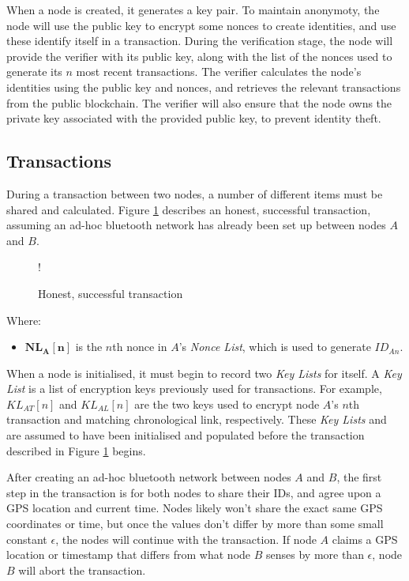 \documentclass[12pt]{article}
\begin{document}

When a node is created, it generates a key pair. To maintain anonymoty, the node will use the public key to encrypt some nonces to create identities, and use these identify itself in a transaction. During the verification stage, the node will provide the verifier with its public key, along with the list of the nonces used to generate its $n$ most recent transactions. The verifier calculates the node's identities using the public key and nonces, and retrieves the relevant transactions from the public blockchain. The verifier will also ensure that the node owns the private key associated with the provided public key, to prevent identity theft.

\subsection{Transactions} \label{sec:transactions}
During a transaction between two nodes, a number of different items must be shared and calculated. Figure \ref{fig:transaction} describes an honest, successful transaction, assuming an ad-hoc bluetooth network has already been set up between nodes $A$ and $B$.

\begin{figure}[h]
\resizebox {\columnwidth} {!} {}
\caption{Honest, successful transaction}
\label{fig:transaction}
\end{figure}

Where:
\begin{itemize}[noitemsep,topsep=0pt]
	\item[] $\mathbf{NL_A[n]}$ is the $n$th nonce in $A$'s \textit{Nonce List}, which is used to generate $ID_{An}$.
\end{itemize}

\null
When a node is initialised, it must begin to record two \textit{Key Lists} for itself. A \textit{Key List} is a list of encryption keys previously used for transactions. For example, $KL_{AT}[n]$ and $KL_{AL}[n]$ are the two keys used to encrypt node $A$'s $n$th transaction and matching chronological link, respectively. These \textit{Key Lists} and are assumed to have been initialised and populated before the transaction described in Figure \ref{fig:transaction} begins.

After creating an ad-hoc bluetooth network between nodes $A$ and $B$, the first step in the transaction is for both nodes to share their IDs, and agree upon a GPS location and current time. Nodes likely won't share the exact same GPS coordinates or time, but once the values don't differ by more than some small constant $\epsilon$, the nodes will continue with the transaction. If node $A$ claims a GPS location or timestamp that differs from what node $B$ senses by more than $\epsilon$, node $B$ will abort the transaction.
\end{document}

